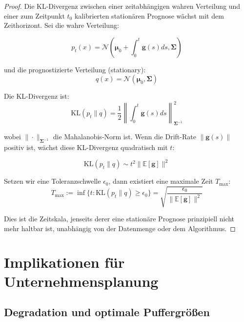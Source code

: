 \documentclass[12pt, a4paper, titlepage]{report}
\theoremstyle{definition}
\theoremstyle{remark}
\newcommand{\KL}{\mathrm{KL}}
\begin{document}
\begin{proof}
Die KL-Divergenz zwischen einer zeitabhängigen wahren Verteilung und einer zum Zeitpunkt $t_0$ kalibrierten stationären Prognose wächst mit dem Zeithorizont. Sei die wahre Verteilung:

\begin{equation}
p_t(x) = \mathcal{N}(\bm{\mu}_0 + \int_0^t \bm{g}(s) ds, \bm{\Sigma})
\end{equation}

und die prognostizierte Verteilung (stationary):
\begin{equation}
q(x) = \mathcal{N}(\bm{\mu}_0, \bm{\Sigma})
\end{equation}

Die KL-Divergenz ist:
\begin{equation}
\KL(p_t \parallel q) = \frac{1}{2} \left\| \int_0^t \bm{g}(s) ds \right\|_{\bm{\Sigma}^{-1}}^2
\end{equation}

wobei $\| \cdot \|_{\bm{\Sigma}^{-1}}$ die Mahalanobis-Norm ist. Wenn die Drift-Rate $\| \bm{g}(s) \|$ positiv ist, wächst diese KL-Divergenz quadratisch mit $t$:

\begin{equation}
\KL(p_t \parallel q) \sim t^2 \| \mathbb{E}[\bm{g}] \|^2
\end{equation}

Setzen wir eine Toleranzschwelle $\epsilon_0$, dann existiert eine maximale Zeit $T_{\max}$:
\begin{equation}
T_{\max} := \inf\{t : \KL(p_t \parallel q) \geq \epsilon_0 \} = \sqrt{\frac{\epsilon_0}{\| \mathbb{E}[\bm{g}] \|^2}}
\end{equation}

Dies ist die Zeitskala, jenseits derer eine stationäre Prognose prinzipiell nicht mehr haltbar ist, unabhängig von der Datenmenge oder dem Algorithmus.
\end{proof}

\chapter{Implikationen für Unternehmensplanung}
\label{sec:planung}

\section{Degradation und optimale Puffergrößen}
\end{document}

